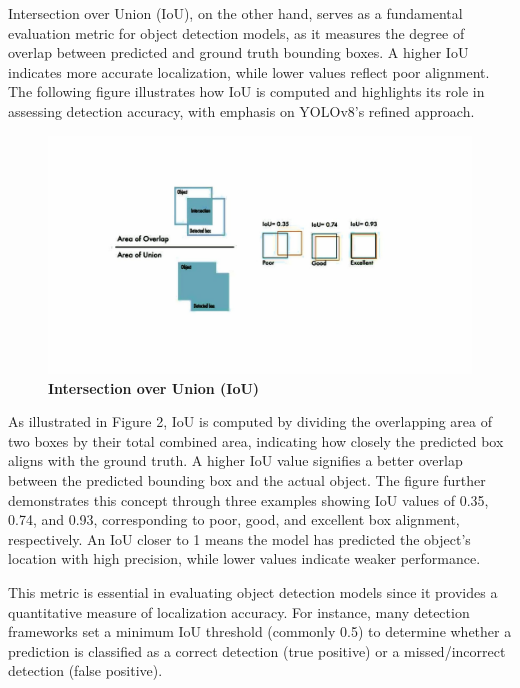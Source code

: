 \begin{refsection}
Intersection over Union (IoU), on the other hand, serves as a fundamental evaluation metric for object detection models, as it measures the degree of overlap between predicted and ground truth bounding boxes. A higher IoU indicates more accurate localization, while lower values reflect poor alignment. The following figure illustrates how IoU is computed and highlights its role in assessing detection accuracy, with emphasis on YOLOv8’s refined approach.


\begin{figure}[H]
    \centering
    \includegraphics[width=1\textwidth]{figures/Fig 2.jpg}
    \caption{\textbf{Intersection over Union (IoU)}}
    \label{figures/Fig 2.jpg}
\end{figure}


As illustrated in Figure 2, IoU is computed by dividing the overlapping area of two boxes by their total combined area, indicating how closely the predicted box aligns with the ground truth. A higher IoU value signifies a better overlap between the predicted bounding box and the actual object. The figure further demonstrates this concept through three examples showing IoU values of 0.35, 0.74, and 0.93, corresponding to poor, good, and excellent box alignment, respectively. An IoU closer to 1 means the model has predicted the object’s location with high precision, while lower values indicate weaker performance. \cite{Terven2023}


This metric is essential in evaluating object detection models since it provides a quantitative measure of localization accuracy. For instance, many detection frameworks set a minimum IoU threshold (commonly 0.5) to determine whether a prediction is classified as a correct detection (true positive) or a missed/incorrect detection (false positive).





\end{refsection}
